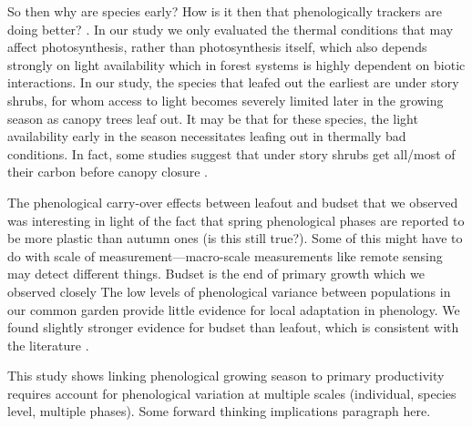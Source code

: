 \documentclass[12 pt]{article}
\begin{document}
So then why are species early? How is it then that phenologically trackers are doing better? \citep{}. In our study we only evaluated the thermal conditions that may affect photosynthesis, rather than photosynthesis itself, which also depends strongly on light availability which in forest systems is highly dependent on biotic interactions. In our study, the species that leafed out the earliest are under story shrubs, for whom access to light becomes severely limited later in the growing season as canopy trees leaf out. It may be that for these species, the light availability early in the season necessitates leafing out in thermally bad conditions. In fact, some studies suggest that under story shrubs get all/most of their carbon before canopy closure \citep{}.

The phenological carry-over effects between leafout and budset that we observed was interesting in light of the fact that spring phenological phases are reported to be more plastic than autumn ones (is this still true?). Some of this might have to do with scale of measurement---macro-scale measurements like remote sensing may detect different things. Budset is the end of primary growth which we observed closely   
The low levels of phenological variance between populations in our common garden provide little evidence for local adaptation in phenology. We found slightly stronger evidence for budset than leafout, which is consistent with the literature \citep{}. 

 This study shows linking phenological growing season to primary productivity requires account for phenological variation at multiple scales (individual, species level, multiple phases). Some forward thinking implications paragraph here.
\end{document}
